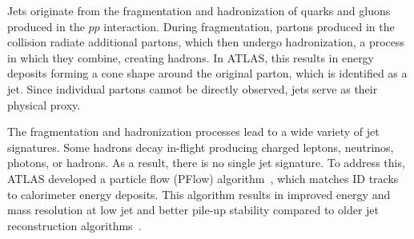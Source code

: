 Jets originate from the fragmentation and hadronization of quarks and gluons produced in the $pp$ interaction. During fragmentation, partons produced in the collision radiate additional partons, which then undergo hadronization, a process in which they combine, creating hadrons. In ATLAS, this results in energy deposits forming a cone shape around the original parton, which is identified as a jet. Since individual partons cannot be directly observed, jets serve as their physical proxy.

The fragmentation and hadronization processes lead to a wide variety of jet signatures. Some hadrons decay in-flight producing charged leptons, neutrinos, photons, or hadrons. As a result, there is no single jet signature. To address this, ATLAS developed a particle flow (PFlow) algorithm~\cite{ATLAS:2017ghe}, which matches ID tracks to calorimeter energy deposits. This algorithm results in improved energy and mass resolution at low jet \pt{} and better pile-up stability compared to older jet reconstruction algorithms~\cite{ATL-PHYS-PUB-2022-038}.